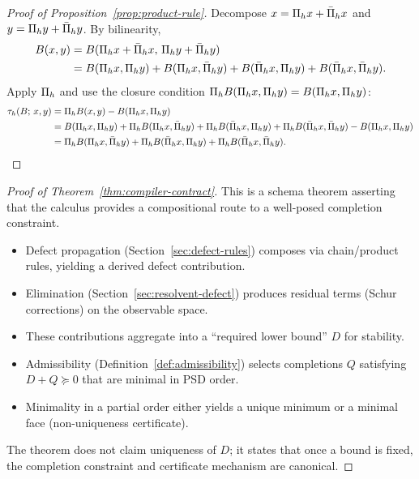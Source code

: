 \begin{proof}[Proof of Proposition~\ref{prop:product-rule}]
\label{proof:prop:product-rule}
Decompose $x = \Pi_{h} x + \bar{\Pi}_{h} x$ and $y = \Pi_{h} y + \bar{\Pi}_{h} y$.
By bilinearity,
\begin{align*}
B(x,y) &= B(\Pi_{h} x + \bar{\Pi}_{h} x,\, \Pi_{h} y + \bar{\Pi}_{h} y) \\
&= B(\Pi_{h} x, \Pi_{h} y) + B(\Pi_{h} x, \bar{\Pi}_{h} y) + B(\bar{\Pi}_{h} x, \Pi_{h} y) + B(\bar{\Pi}_{h} x, \bar{\Pi}_{h} y).
\end{align*}
Apply $\Pi_{h}$ and use the closure condition $\Pi_{h} B(\Pi_{h} x, \Pi_{h} y) = B(\Pi_{h} x, \Pi_{h} y)$:
\begin{align*}
\tau_{h}(B;\, x, y) &= \Pi_{h} B(x,y) - B(\Pi_{h} x, \Pi_{h} y) \\
&= B(\Pi_{h} x, \Pi_{h} y) + \Pi_{h} B(\Pi_{h} x, \bar{\Pi}_{h} y) + \Pi_{h} B(\bar{\Pi}_{h} x, \Pi_{h} y) + \Pi_{h} B(\bar{\Pi}_{h} x, \bar{\Pi}_{h} y) - B(\Pi_{h} x, \Pi_{h} y)\\
&= \Pi_{h} B(\Pi_{h} x, \bar{\Pi}_{h} y) + \Pi_{h} B(\bar{\Pi}_{h} x, \Pi_{h} y) + \Pi_{h} B(\bar{\Pi}_{h} x, \bar{\Pi}_{h} y). \qedhere
\end{align*}
\end{proof}


\begin{proof}[Proof of Theorem~\ref{thm:compiler-contract}]
\label{proof:thm:compiler-contract}
This is a schema theorem asserting that the calculus provides a compositional route to a well-posed completion constraint.
\begin{itemize}[itemsep=0.1em]
\item Defect propagation (Section~\ref{sec:defect-rules}) composes via chain/product rules, yielding a derived defect contribution.
\item Elimination (Section~\ref{sec:resolvent-defect}) produces residual terms (Schur corrections) on the observable space.
\item These contributions aggregate into a ``required lower bound'' $D$ for stability.
\item Admissibility (Definition~\ref{def:admissibility}) selects completions $Q$ satisfying $D + Q \succeq 0$ that are minimal in PSD order.
\item Minimality in a partial order either yields a unique minimum or a minimal face (non-uniqueness certificate).
\end{itemize}
The theorem does not claim uniqueness of $D$; it states that once a bound is fixed, the completion constraint and certificate mechanism are canonical.
\end{proof}

